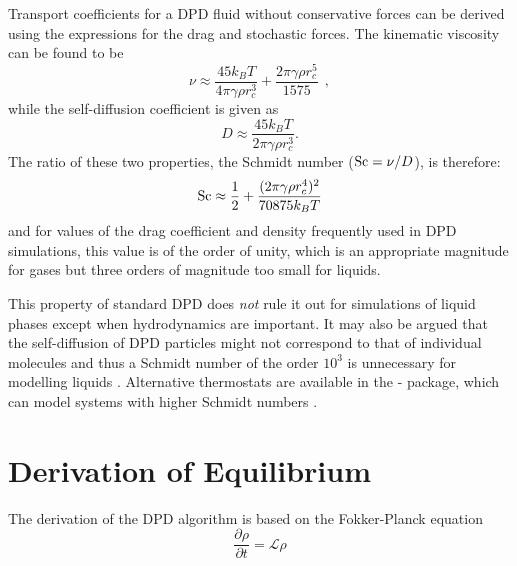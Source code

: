 Transport coefficients for a DPD fluid without conservative forces can be derived using
the expressions for the drag and stochastic forces\cite{groot-97a,koelman-93a,marsh-97a}.
The kinematic viscosity can be found to be
\begin{equation}
\nu \approx \frac{45 k_{B} T}{4 \pi \gamma \rho r_{c}^{3}} + \frac{2 \pi \gamma \rho r_{c}^{5}}{1575}~~,
\end{equation}
while the self-diffusion coefficient is given as
\begin{equation}
D \approx \frac{45 k_{B} T}{2 \pi \gamma \rho r_{c}^{3}}.
\end{equation}
The ratio of these two properties, the Schmidt number ($\textnormal{Sc} = \nu / D$), is therefore:
\begin{equation}
\textnormal{Sc} \approx \frac{1}{2} + \frac{(2 \pi \gamma \rho r_{c}^{4})^{2}}{70875 k_{B} T}
\end{equation}
and for values of the drag coefficient and density frequently used in DPD simulations,
this value is of the order of unity, which is an appropriate magnitude for gases but
three orders of magnitude too small for liquids.

This property of standard DPD does \emph{not} rule it out for simulations of liquid phases
except when hydrodynamics are important.  It may also be argued that the self-diffusion of
DPD particles might not correspond to that of individual molecules and thus a Schmidt number
of the order $10^{3}$ is unnecessary for modelling liquids \cite{peters-04a}.  Alternative
thermostats are available in the \M \cite{seaton-13a} - \WEM{} package, which can
model systems with higher Schmidt numbers \cite{lowe-99a,stoyanov-05a}.

\section{Derivation of Equilibrium}

The derivation of the DPD algorithm is based on the Fokker-Planck equation
\begin{equation}
\frac{\partial \rho}{\partial t} = \mathcal{L} \rho \label{FokkerPlanck}
\end{equation}

